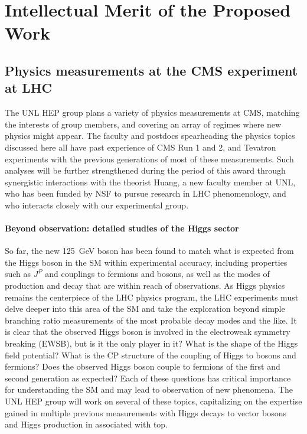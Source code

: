 \section{Intellectual Merit of the Proposed Work}
\label{sec:future}

\subsection{Physics measurements at the CMS experiment at LHC}

The UNL HEP group plans a variety of physics measurements at CMS, matching the interests of group members, and covering an array of regimes where new physics might appear. The faculty and postdocs spearheading the physics topics discussed here all have past experience of CMS Run 1 and 2, and Tevatron experiments with the previous generations of most of these measurements. Such analyses will be further strengthened during the period of this award through synergistic interactions with the theorist Huang, a new faculty member at UNL, who has been funded by NSF to pursue research in LHC phenomenology, and who interacts closely with our experimental group.

\paragraph{Beyond observation: detailed studies of the Higgs sector} 
So far, the  new 125~GeV boson has been found to match what is expected from the Higgs boson in the SM within experimental accuracy, including properties such as $J^P$ and couplings to fermions and bosons, as well as the modes of production and decay that are within reach of observations. As Higgs physics remains the centerpiece of the LHC physics program, the LHC experiments must delve deeper into this area of the SM and take the exploration beyond simple branching ratio measurements of the most probable decay modes and  the like. It is clear that the observed Higgs boson is involved in the electroweak symmetry breaking (EWSB), but is it the only player in it? What is the shape of the Higgs field potential? What is the CP structure of the coupling of Higgs to bosons and fermions? Does the observed Higgs boson couple to fermions of the first and second generation as expected? Each of these questions has critical importance for understanding the SM and may lead to observation of new phenomena. The UNL HEP group will work on several of these  topics, capitalizing on the expertise gained in multiple previous measurements with Higgs decays to vector bosons and Higgs production in associated with top.

